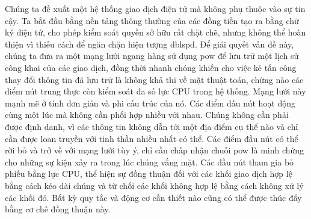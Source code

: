 \documentclass{scrartcl}
\begin{document}
Chúng ta đề xuất một hệ thống giao dịch điện tử mà không phụ thuộc vào sự tin cậy.
Ta bắt đầu bằng nền tảng thông thường của các đồng tiền tạo ra bằng chữ ký điện tử, cho phép kiểm soát quyền sở hữu rất chặt chẽ, nhưng không thể hoàn thiện vì thiếu cách để ngăn chặn hiện tượng \gls{dblspd}.
Để giải quyết vấn đề này, chúng ta đưa ra một mạng lưới ngang hàng sử dụng \gls{pow} để lưu trữ một lịch sử công khai của các giao dịch, đồng thời nhanh chóng khiến cho việc kẻ tấn công thay đổi thông tin đã lưu trữ là không khả thi về mặt thuật toán, chừng nào các điểm nút trung thực còn kiểm soát đa số lực CPU trong hệ thống.
Mạng lưới này mạnh mẽ ở tính đơn giản và phi cấu trúc của nó.
Các điểm đầu nút hoạt động cùng một lúc mà không cần phối hợp nhiều với nhau.
Chúng không cần phải được định danh, vì các thông tin không dẫn tới một địa điểm cụ thể nào và chỉ cần được loan truyền với tinh thần nhiều nhất có thể.
Các điểm đầu nút có thể rời bỏ và trở về với mạng lưới tùy ý, chỉ cần chấp nhận chuỗi \gls{pow} là minh chứng cho những sự kiện xảy ra trong lúc chúng vắng mặt.
Các đầu nút tham gia bỏ phiếu bằng lực CPU, thể hiện sự đồng thuận đối với các khối giao dịch hợp lệ bằng cách kéo dài chúng và từ chối các khối không hợp lệ bằng cách không xử lý các khối đó.
Bất kỳ quy tắc và động cơ cần thiết nào cũng có thể được thúc đẩy bằng cơ chế đồng thuận này.

\pagebreak
\printglossary[title=Danh mục thuật ngữ]
\printbibliography
\end{document}
